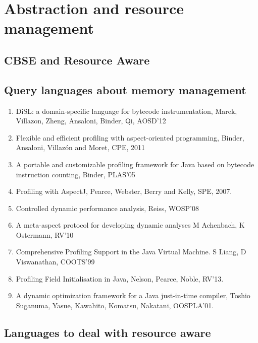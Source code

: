 \chapter{Abstraction and resource management}
\label{chap:abstractions_and_resource_management}


\section{CBSE and Resource Aware}

\section{Query languages about memory management}

\begin{enumerate}
\item DiSL: a domain-specific language for bytecode instrumentation, Marek, Villazon, Zheng, Ansaloni, Binder, Qi, AOSD'12

\item Flexible and efficient profiling with aspect-oriented programming, Binder, Ansaloni, Villazón and Moret, CPE, 2011

\item A portable and customizable profiling framework for Java based on bytecode instruction counting, Binder, PLAS'05

\item Profiling with AspectJ, Pearce, Webster, Berry and Kelly, SPE, 2007.

\item Controlled dynamic performance analysis, Reiss, WOSP'08

\item A meta-aspect protocol for developing dynamic analyses M Achenbach, K Ostermann, RV'10

\item Comprehensive Profiling Support in the Java Virtual Machine. S Liang, D Viswanathan, COOTS'99

\item Profiling Field Initialisation in Java, Nelson, Pearce, Noble, RV'13.

\item A dynamic optimization framework for a Java just-in-time compiler, Toshio Suganuma, Yasue, Kawahito, Komatsu, Nakatani, OOSPLA'01.
\end{enumerate}



\section{Languages to deal with resource aware}
